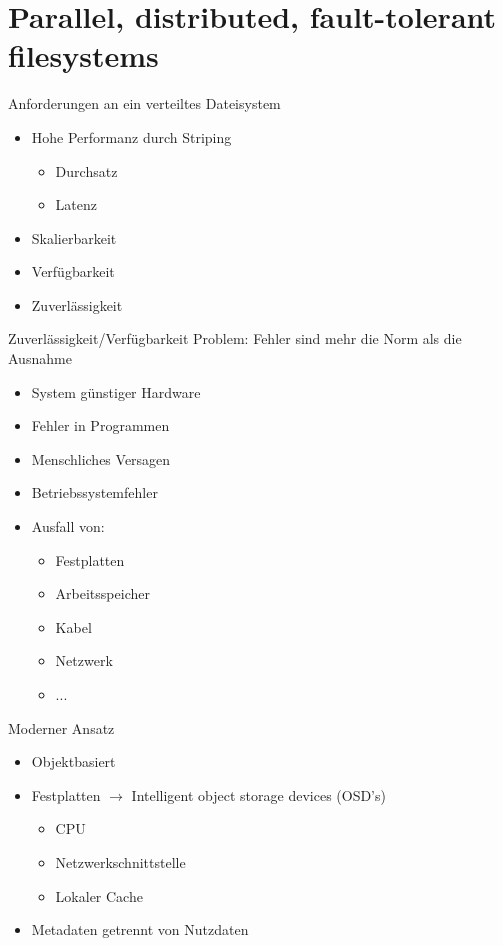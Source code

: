 \documentclass[hyperref={xetex}]{beamer}
\begin{document}
\section{Parallel, distributed, fault-tolerant filesystems}
\begin{frame}{Anforderungen an ein verteiltes Dateisystem}
	\begin{itemize}
		\item Hohe Performanz durch Striping
			\begin{itemize}
				\item Durchsatz
				\item Latenz
			\end{itemize}
		\item Skalierbarkeit
		\item Verf\"ugbarkeit
		\item Zuverl\"assigkeit
	\end{itemize}
\end{frame}

\begin{frame}{Zuverl\"assigkeit/Verf\"ugbarkeit}
  \alert{Problem:} Fehler sind mehr die Norm als die Ausnahme
	\begin{itemize}
		\item System g\"unstiger Hardware
		\item Fehler in Programmen %
		\item Menschliches Versagen %
		\item Betriebssystemfehler %
		\item Ausfall von: 
		\begin{itemize}
			\item Festplatten
			\item Arbeitsspeicher
			\item Kabel
			\item Netzwerk
			\item ...
		\end{itemize}
	\end{itemize}		
\end{frame}

\begin{frame}{Moderner Ansatz}
	\begin{itemize}
		\item Objektbasiert
		\item Festplatten $\rightarrow$ Intelligent object storage devices (OSD's)
		\begin{itemize}
			\item CPU
			\item Netzwerkschnittstelle
			\item Lokaler Cache
		\end{itemize}
		\item Metadaten getrennt von Nutzdaten
	\end{itemize}
\end{frame}
\end{document}
